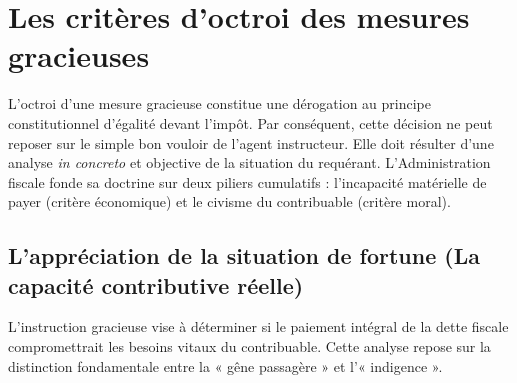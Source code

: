 \documentclass[Cours_contentieuxTF2026.tex]{subfiles}
\begin{document}
	
 \section{Les critères d'octroi des mesures gracieuses}
 
 L'octroi d'une mesure gracieuse constitue une dérogation au principe constitutionnel d'égalité devant l'impôt. Par conséquent, cette décision ne peut reposer sur le simple bon vouloir de l'agent instructeur. Elle doit résulter d'une analyse \textit{in concreto} et objective de la situation du requérant. L'Administration fiscale fonde sa doctrine sur deux piliers cumulatifs : l'incapacité matérielle de payer (critère économique) et le civisme du contribuable (critère moral).
 
 \subsection{L'appréciation de la situation de fortune (La capacité contributive réelle)}
 
 L'instruction gracieuse vise à déterminer si le paiement intégral de la dette fiscale compromettrait les besoins vitaux du contribuable. Cette analyse repose sur la distinction fondamentale entre la « gêne passagère » et l'« indigence ».
 
\end{document}
